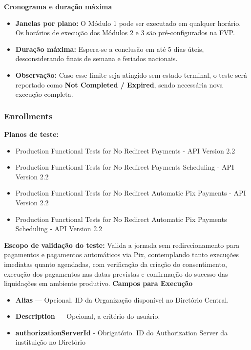 \textbf{Cronograma e duração máxima}

\begin{itemize}
    \item \textbf{Janelas por plano:} O Módulo 1 pode ser executado em qualquer horário. Os horários de execução dos Módulos 2 e 3 são pré-configurados na FVP.
    \item \textbf{Duração máxima:} Espera-se a conclusão em até 5 dias úteis, desconsiderando finais de semana e feriados nacionais.
    \item \textbf{Observação:} Caso esse limite seja atingido sem estado terminal, o teste será reportado como \textbf{Not Completed / Expired}, sendo necessária nova execução completa.
\end{itemize}

\subsubsection{Enrollments}

\textbf{Planos de teste:}

\begin{itemize}
    \item Production Functional Tests for No Redirect Payments - API Version 2.2
    \item Production Functional Tests for No Redirect Payments Scheduling - API Version 2.2
    \item Production Functional Tests for No Redirect Automatic Pix Payments - API Version 2.2
    \item Production Functional Tests for No Redirect Automatic Pix Payments Scheduling - API Version 2.2
\end{itemize}
\medskip
\textbf{Escopo de validação do teste:}
\medskip
Valida a jornada sem redirecionamento para pagamentos e pagamentos automáticos via Pix, contemplando tanto execuções imediatas quanto agendadas, com verificação da criação do consentimento, execução dos pagamentos nas datas previstas e confirmação do sucesso das liquidações em ambiente produtivo.
\medskip
\textbf{Campos para Execução}

\begin{itemize}
    \item \textbf{Alias} — Opcional. ID da Organização disponível no Diretório Central.
    \item \textbf{Description} — Opcional, a critério do usuário.
    \item \textbf{\textcolor{red!80}{authorizationServerId}} - Obrigatório. ID do Authorization Server da instituição no Diretório
\end{itemize}

